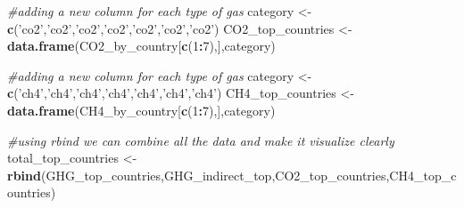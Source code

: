 \documentclass[
]{article}
\newenvironment{Shaded}{\begin{snugshade}}{\end{snugshade}}
\newcommand{\CommentTok}[1]{\textcolor[rgb]{0.56,0.35,0.01}{\textit{#1}}}
\newcommand{\DecValTok}[1]{\textcolor[rgb]{0.00,0.00,0.81}{#1}}
\newcommand{\KeywordTok}[1]{\textcolor[rgb]{0.13,0.29,0.53}{\textbf{#1}}}
\newcommand{\NormalTok}[1]{#1}
\newcommand{\OperatorTok}[1]{\textcolor[rgb]{0.81,0.36,0.00}{\textbf{#1}}}
\newcommand{\StringTok}[1]{\textcolor[rgb]{0.31,0.60,0.02}{#1}}
\begin{document}
\begin{Shaded}
\begin{Highlighting}[]
\CommentTok{#adding a new column for each type of gas }
\NormalTok{category <-}\StringTok{ }\KeywordTok{c}\NormalTok{(}\StringTok{'co2'}\NormalTok{,}\StringTok{'co2'}\NormalTok{,}\StringTok{'co2'}\NormalTok{,}\StringTok{'co2'}\NormalTok{,}\StringTok{'co2'}\NormalTok{,}\StringTok{'co2'}\NormalTok{,}\StringTok{'co2'}\NormalTok{)}
\NormalTok{CO2_top_countries <-}\StringTok{ }\KeywordTok{data.frame}\NormalTok{(CO2_by_country[}\KeywordTok{c}\NormalTok{(}\DecValTok{1}\OperatorTok{:}\DecValTok{7}\NormalTok{),],category)}
\end{Highlighting}
\end{Shaded}

\begin{Shaded}
\begin{Highlighting}[]
\CommentTok{#adding a new column for each type of gas }
\NormalTok{category <-}\KeywordTok{c}\NormalTok{(}\StringTok{'ch4'}\NormalTok{,}\StringTok{'ch4'}\NormalTok{,}\StringTok{'ch4'}\NormalTok{,}\StringTok{'ch4'}\NormalTok{,}\StringTok{'ch4'}\NormalTok{,}\StringTok{'ch4'}\NormalTok{,}\StringTok{'ch4'}\NormalTok{)}
\NormalTok{CH4_top_countries <-}\KeywordTok{data.frame}\NormalTok{(CH4_by_country[}\KeywordTok{c}\NormalTok{(}\DecValTok{1}\OperatorTok{:}\DecValTok{7}\NormalTok{),],category)}
\end{Highlighting}
\end{Shaded}

\begin{Shaded}
\begin{Highlighting}[]
\CommentTok{#using rbind we can combine all the data and make it visualize clearly}
\NormalTok{total_top_countries <-}\StringTok{ }\KeywordTok{rbind}\NormalTok{(GHG_top_countries,GHG_indirect_top,CO2_top_countries,CH4_top_countries)}
\end{Highlighting}
\end{Shaded}
\end{document}
